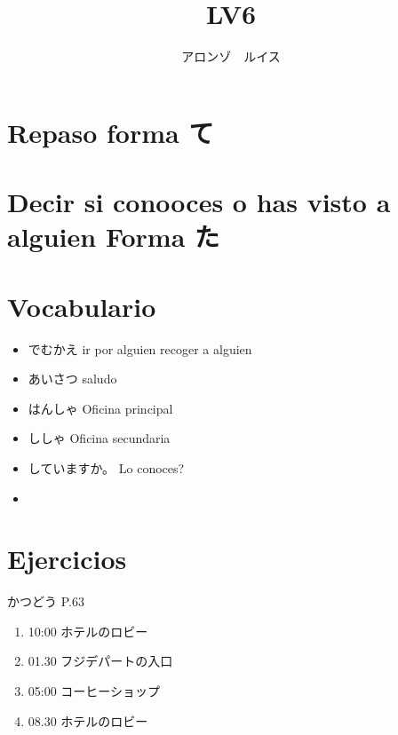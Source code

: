 \documentclass[a4paper,lualatex,ja=standard,base=10pt]{bxjsarticle}
\title{\ruby{第|１３|課}{だい||か} LV6}
\author{アロンゾ　ルイス}
\begin{document}
\setcounter{page}{1}

\maketitle{}
\thispagestyle{fancy}

\section{Repaso forma て}


\section{Decir si conooces o has visto a alguien Forma た}



\section{Vocabulario}

\begin{itemize}
  \item でむかえ ir por alguien recoger a alguien
  \item あいさつ saludo
  \item はんしゃ Oficina principal
  \item ししゃ Oficina secundaria
  \item していますか。 Lo conoces?
  \item 
\end{itemize}

\section{Ejercicios}

かつどう P.63

\begin{enumerate}
  \item 10:00 ホテルのロビー
  \item 01.30 フジデパートの入口
  \item 05:00 コーヒーショップ
  \item 08.30 ホテルのロビー
\end{enumerate}
\end{document}
